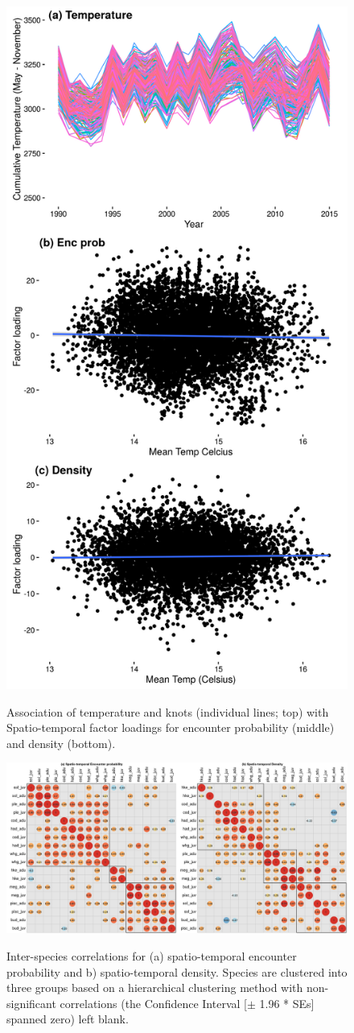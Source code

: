 \documentclass{article}
\begin{document}
\begin{figure}[!ht]
\begin{center}
	\includegraphics[width = 0.6\linewidth]{"figures/Suppl - TempAndFactors"}
	\label{fig:S6}
	\caption{Association of temperature and knots (individual lines; top)
		with Spatio-temporal factor loadings for encounter probability
	(middle) and density (bottom).}
	\end{center}
\end{figure}



\begin{figure}[!ht]
\begin{center}
	\includegraphics[width = \linewidth]{"figures/Suppl - Epsilon1Epsilon2_Correlations_blank"}
	\label{fig:S8}
	\caption{Inter-species correlations for (a) spatio-temporal encounter
		probability and b) spatio-temporal density. Species are
		clustered into three groups based on a hierarchical clustering
		method with non-significant correlations (the Confidence
		Interval [$\pm$ 1.96 * SEs] spanned zero) left blank.}
	\end{center}
\end{figure}
\end{document}
